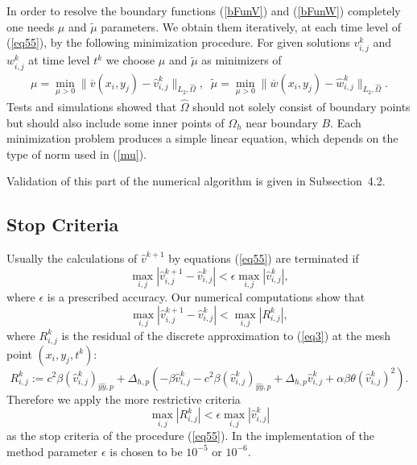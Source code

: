 \documentclass[preprint]{elsarticle}
\newcommand{\rf}[1]{(\ref{#1})}
\def\bar#1{{\overline{#1}}}
\begin{document}
In order to resolve the boundary functions \rf{bFunV} and \rf{bFunW} completely one needs $\mu$ and $\tilde {\mu}$ parameters.
We obtain them iteratively, at each time level of \rf{eq55}, by the following minimization procedure. For  given solutions  $v^k_{i,j}$ and $ w^k_{i,j}$ at time level $t^k$ 
we choose $\mu$ and $\tilde {\mu}$ as minimizers of 
\begin{equation}\label{mu}
\begin{split}
\mu = \underset{\mu>0 }{\operatorname{min} } \| \bar{v}(x_i,y_j) - \widehat{v}^k_{i,j} \|_{L_2,\widehat{\Omega}},
\;\;
\tilde {\mu} = \underset{\mu>0 }{\operatorname{min} } \| \bar{w}(x_i,y_j) -\widehat{w}^k_{i,j} \|_{L_2,\widehat{\Omega}}.
\end{split}
\end{equation}
Tests and simulations showed that $ \widehat{\Omega} $ should not solely consist of boundary points but should also include some inner points of $\Omega_h$ near boundary $B$.
Each minimization problem produces a simple linear equation, which depends on the type of norm used in \rf{mu}. 

Validation of this part of the numerical algorithm is given in Subsection~4.2. 

\subsection{Stop Criteria}

Usually  the calculations of  $\widehat{v}^{k+1} $ by equations \rf{eq55} are  terminated if
\begin{equation*}
\max_{i,j} |\widehat{v}^{k+1}_{i,j}-\widehat{v}^{k}_{i,j}| < \epsilon \max_{i,j} |\widehat{v}^{k}_{i,j}| ,
\end{equation*}
where $\epsilon $ is a prescribed accuracy. 
Our numerical computations show that 
$$
\max_{i,j} |\widehat{v}^{k+1}_{i,j}-\widehat{v}^{k}_{i,j}| < \max_{i,j} | R_{i,j}^k |,
$$
where $R^k_{i,j}$ is the residual of the discrete approximation to \rf{eq3} at the mesh point $(x_i,y_j,t^k)$:
\begin{equation}\label{residual}
R_{i,j}^k := 
c^2\beta (\widehat{v}^k_{i,j})_{\widehat{yy},p} + \Delta_{h,p}(-\beta \widehat{v}^k_{i,j} - c^2\beta (\widehat{v}^k_{i,j})_{\widehat{yy},p} + \Delta_{h,p} \widehat{v}^k_{i,j} 
+ \alpha \beta \theta (\widehat{v}^k_{i,j})^2  ).
\end{equation}
Therefore we
apply the more restrictive criteria
\begin{equation}\label{stopCrit}
\max_{i,j} | R_{i,j}^k | < \epsilon \max_{i,j} |\widehat{v}^{k}_{i,j}|
\end{equation}
as  the  stop criteria of the procedure \rf{eq55}.  
In the implementation of the method  parameter $\epsilon$ is chosen to be $10^{-5}$ or $ 10^{-6}$.
\end{document}
